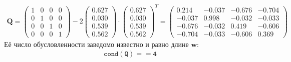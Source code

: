 \documentclass[a4paper]{article}
\begin{document}
\begin{align}
    \mathbf{Q} =
    \begin{pmatrix}
        1 & 0 & 0 & 0 \\
        0 & 1 & 0 & 0 \\
        0 & 0 & 1 & 0 \\
        0 & 0 & 0 & 1
    \end{pmatrix} - 2
    \begin{pmatrix}
        0.627 \\
        0.030 \\
        0.539 \\
        0.562
    \end{pmatrix} \cdot
    \begin{pmatrix}
        0.627 \\
        0.030 \\
        0.539 \\
        0.562
    \end{pmatrix} ^T =
    \begin{pmatrix}
        0.214 & -0.037 &  -0.676 &  -0.704 \\
        -0.037 &   0.998 & -0.032 & -0.033 \\
        -0.676 & -0.032  &  0.419 &  -0.606 \\
        -0.704 & -0.033  & -0.606  &   0.369
    \end{pmatrix}
\end{align}
Её число обусловленности заведомо известно и равно длине $\mathbf{w}$:
\begin{align}
    \mathtt{cond(Q) == 4}
\end{align}
\end{document}
